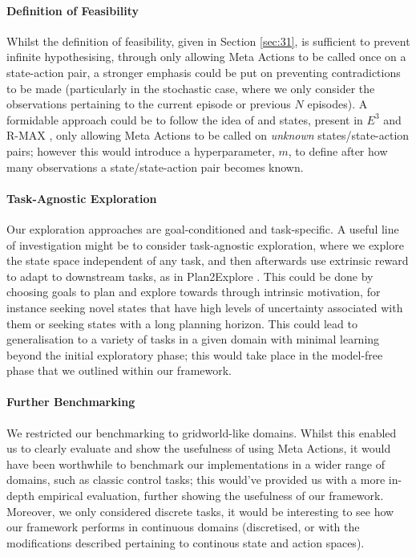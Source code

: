 \paragraph*{Definition of Feasibility}
Whilst the definition of feasibility, given in Section \ref{sec:31}, is sufficient to prevent infinite hypothesising, through only allowing Meta Actions to be called once on a state-action pair, a stronger emphasis could be put on preventing contradictions to be made (particularly in the stochastic case, where we only consider the observations pertaining to the current episode or previous $N$ episodes). A formidable approach could be to follow the idea of  and  states, present in $E^3$ \cite{Kearns+Singh:2002} and R-MAX \cite{10.1162/153244303765208377}, only allowing Meta Actions to be called on \textit{unknown} states/state-action pairs; however this would introduce a hyperparameter, $m$, to define after how many observations a state/state-action pair becomes known.
\paragraph*{Task-Agnostic Exploration}

Our exploration approaches are goal-conditioned and task-specific. A useful line of investigation might be to consider task-agnostic exploration, where we explore the state space independent of any task, and then afterwards use extrinsic reward to adapt to downstream tasks, as in Plan2Explore \cite{plan2explore}. This could be done by choosing goals to plan and explore towards through intrinsic motivation, for instance seeking novel states that have high levels of uncertainty associated with them or seeking states with a long planning horizon. This could lead to generalisation to a variety of tasks in a given domain with minimal learning beyond the initial exploratory phase; this would take place in the model-free phase that we outlined within our framework.

\paragraph*{Further Benchmarking}
We restricted our benchmarking to gridworld-like domains. Whilst this enabled us to clearly evaluate and show the usefulness of using Meta Actions, it would have been worthwhile to benchmark our implementations in a wider range of domains, such as classic control tasks; this would've provided us with a more in-depth empirical evaluation, further showing the usefulness of our framework. Moreover, we only considered discrete tasks, it would be interesting to see how our framework performs in continuous domains (discretised, or with the modifications described pertaining to continous state and action spaces).

